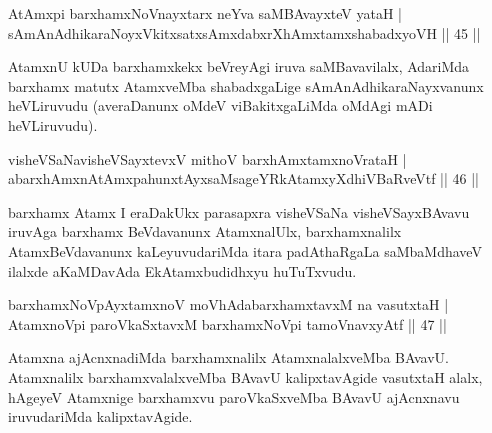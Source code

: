 \begin{shl}
AtAmx\s pi barxhamxNoV\s nayxtarx neYva saMBAvayxteV yataH |\\
sAmAnAdhikaraNoyxVkitxsatxsAmxdabxrXhAmxtamxshabadxyoVH \hfill || 45 ||
\end{shl}

\begin{artha}
AtamxnU kUDa barxhamxkekx beVreyAgi iruva saMBavavilalx, AdariMda barxhamx matutx AtamxveMba shabadxgaLige sAmAnAdhikaraNayxvanunx heVLiruvudu (averaDanunx oMdeV viBakitxgaLiMda oMdAgi mADi heVLiruvudu).
\end{artha}

\begin{shl}
\footnotemark[1]{}visheVSaNavisheVSayxtevxV mithoV barxhAmxtamxnoVrataH |\\
abarxhAmxnAtAmxpahunxtAyx\s saMsageYRkAtamxyXdhiVBaRveVtf \hfill || 46 ||
\end{shl}

\begin{artha}
barxhamx Atamx I eraDakUkx parasapxra visheVSaNa visheVSayxBAvavu iruvAga barxhamx BeVdavanunx AtamxnalUlx, barxhamxnalilx AtamxBeVdavanunx kaLeyuvudariMda itara padAthaRgaLa saMbaMdhaveV ilalxde aKaMDavAda EkAtamxbudidhxyu huTuTxvudu.
\end{artha}

\begin{shl}
barxhamxNoV\s pAyxtamxnoV moVhAdabarxhamxtavxM na vasutxtaH |\\
AtamxnoV\s pi paroVkaSxtavxM barxhamxNoV\s pi tamoVnavxyAtf \hfill || 47 ||
\end{shl}	

\begin{artha}%
Atamxna ajAcnxnadiMda barxhamxnalilx AtamxnalalxveMba BAvavU. Atamxnalilx barxhamxvalalxveMba BAvavU kalipxtavAgide vasutxtaH alalx, hAgeyeV Atamxnige barxhamxvu paroVkaSxveMba BAvavU ajAcnxnavu iruvudariMda kalipxtavAgide. 
\end{artha}

